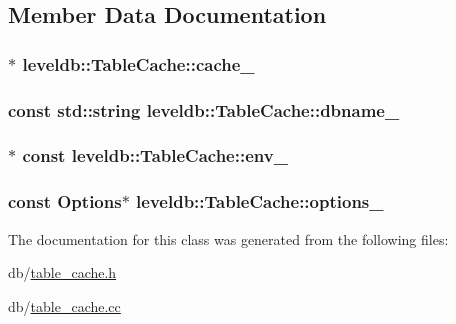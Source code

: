 \subsection{Member Data Documentation}
\hypertarget{classleveldb_1_1_table_cache_a27afd704a6aa631d57c684e0b8c548c6}{
\subsubsection[{cache\-\_\-}]{$\ast$ leveldb\-::\-Table\-Cache\-::cache\-\_\-\hspace{0.3cm}{\ttfamily [private]}}}\label{classleveldb_1_1_table_cache_a27afd704a6aa631d57c684e0b8c548c6}
\hypertarget{classleveldb_1_1_table_cache_adce6e6a7cfbf8822e5035ca44306c77b}{
\subsubsection[{dbname\-\_\-}]{\setlength{\rightskip}{0pt plus 5cm}const std\-::string leveldb\-::\-Table\-Cache\-::dbname\-\_\-\hspace{0.3cm}{\ttfamily [private]}}}\label{classleveldb_1_1_table_cache_adce6e6a7cfbf8822e5035ca44306c77b}
\hypertarget{classleveldb_1_1_table_cache_af5d435597adb6dccac9bd05958f24afb}{
\subsubsection[{env\-\_\-}]{$\ast$ const leveldb\-::\-Table\-Cache\-::env\-\_\-\hspace{0.3cm}{\ttfamily [private]}}}\label{classleveldb_1_1_table_cache_af5d435597adb6dccac9bd05958f24afb}
\hypertarget{classleveldb_1_1_table_cache_ad24157b076d23fc18fe90d530241fd23}{
\subsubsection[{options\-\_\-}]{\setlength{\rightskip}{0pt plus 5cm}const {\bf Options}$\ast$ leveldb\-::\-Table\-Cache\-::options\-\_\-\hspace{0.3cm}{\ttfamily [private]}}}\label{classleveldb_1_1_table_cache_ad24157b076d23fc18fe90d530241fd23}


The documentation for this class was generated from the following files\-:\begin{DoxyCompactItemize}
\item 
db/\hyperlink{table__cache_8h}{table\-\_\-cache.\-h}\item 
db/\hyperlink{table__cache_8cc}{table\-\_\-cache.\-cc}\end{DoxyCompactItemize}
